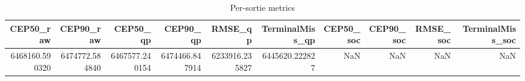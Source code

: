 \begin{table}[t]
\centering
\begin{tabular}{rrrrrrrrrr}
\toprule
CEP50_raw & CEP90_raw & CEP50_qp & CEP90_qp & RMSE_qp & TerminalMiss_qp & CEP50_soc & CEP90_soc & RMSE_soc & TerminalMiss_soc \\
\midrule
6468160.590320 & 6474772.584840 & 6467577.240154 & 6474466.847914 & 6233916.235827 & 6445620.222827 & NaN & NaN & NaN & NaN \\
\bottomrule
\end{tabular}
\caption{Per-sortie metrics}
\label{tab:per_sortie}
\end{table}
